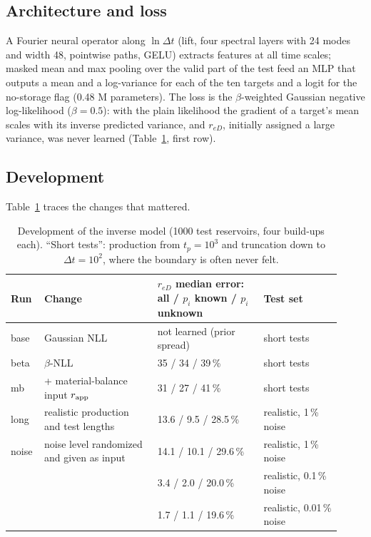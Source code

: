 \documentclass[11pt]{article}
\newcommand{\reD}{r_{eD}}
\begin{document}
\subsection{Architecture and loss}

A Fourier neural operator along $\ln\Delta t$ (lift, four spectral layers with 24 modes and width 48, pointwise
paths, GELU) extracts features at all time scales; masked mean and max pooling over the valid part of the test
feed an MLP that outputs a mean and a log-variance for each of the ten targets and a logit for the no-storage flag
(0.48 M parameters). The loss is the $\beta$-weighted Gaussian negative log-likelihood ($\beta=0.5$): with the plain
likelihood the gradient of a target's mean scales with its inverse predicted variance, and $\reD$, initially
assigned a large variance, was never learned (Table~\ref{tab:runs}, first row).

\subsection{Development}

Table~\ref{tab:runs} traces the changes that mattered.

\begin{table}[h]
  \centering
  \small
  \begin{tabular}{@{}p{0.08\linewidth}p{0.32\linewidth}p{0.3\linewidth}p{0.22\linewidth}@{}}
    \toprule
    Run & Change & $\reD$ median error: all / $p_i$ known / $p_i$ unknown & Test set \\
    \midrule
    base & Gaussian NLL & not learned (prior spread) & short tests \\
    beta & $\beta$-NLL & 35 / 34 / 39\,\% & short tests \\
    mb & + material-balance input $r_{\rm app}$ & 31 / 27 / 41\,\% & short tests \\
    long & realistic production and test lengths & 13.6 / 9.5 / 28.5\,\% & realistic, 1\,\% noise \\
    noise & noise level randomized and given as input & 14.1 / 10.1 / 29.6\,\% & realistic, 1\,\% noise \\
         &  & 3.4 / 2.0 / 20.0\,\% & realistic, 0.1\,\% noise \\
         &  & 1.7 / 1.1 / 19.6\,\% & realistic, 0.01\,\% noise \\
    \bottomrule
  \end{tabular}
  \caption{Development of the inverse model (1000 test reservoirs, four build-ups each). ``Short tests'': production
  from $t_p = 10^3$ and truncation down to $\Delta t = 10^2$, where the boundary is often never felt.}
  \label{tab:runs}
\end{table}
\end{document}
